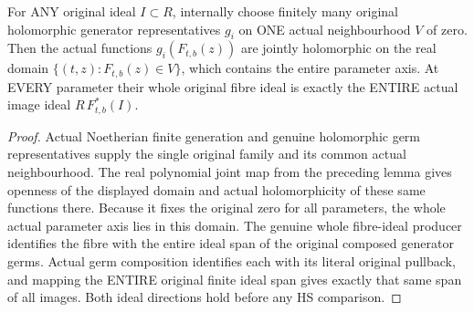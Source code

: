 \begin{theorem}
\label{hir:actual-triangular-deformation-whole-fibre-ideal}
\leanok
For ANY original ideal $I\subset R$, internally choose finitely many
original holomorphic generator representatives $g_i$ on ONE actual
neighbourhood $V$ of zero. Then the actual functions
$g_i(F_{t,b}(z))$ are jointly holomorphic on the real domain
$\{(t,z):F_{t,b}(z)\in V\}$, which contains the entire parameter axis.
At EVERY parameter their whole original fibre ideal is exactly the
ENTIRE actual image ideal $R\,F_{t,b}^*(I)$.
\end{theorem}
\begin{proof}
Actual Noetherian finite generation and genuine holomorphic germ
representatives supply the single original family and its common actual
neighbourhood. The real polynomial joint map from the preceding lemma
gives openness of the displayed domain and actual holomorphicity of
these same functions there. Because it fixes the original zero for all
parameters, the whole actual parameter axis lies in this domain. The
genuine whole fibre-ideal producer identifies the fibre with the entire
ideal span of the original composed generator germs. Actual germ
composition identifies each with its literal original pullback, and
mapping the ENTIRE original finite ideal span gives exactly that same
span of all images. Both ideal directions hold before any HS comparison.
\end{proof}

